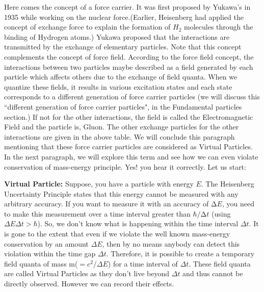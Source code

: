     \par Here comes the concept of a force carrier. It was first proposed by Yukawa's in 1935 while working on the nuclear force.(Earlier, Heisenberg had applied the concept of exchange force to explain the formation of $H_2$ molecules through the binding of Hydrogen atoms.) Yukawa proposed that the interactions are transmitted by the exchange of elementary particles. Note that this concept complements the concept of force field. According to the force field concept, the interactions between two particles maybe described as a field generated by each particle which affects others due to the exchange of field quanta. When we quantize these  fields, it results in various excitation states and each state corresponds to a different generation of force carrier particles (we will discuss this ``different generation of force carrier particles", in the Fundamental particles section.) If not for the other interactions, the field is called the Electromagnetic Field and the particle is, Gluon. The other exchange particles for the other interactions are given in the above table. We will conclude this paragraph mentioning that these force carrier particles are considered as Virtual Particles. In the next paragraph, we will explore this term and see how we can even violate conservation of mass-energy principle. Yes! you hear it correctly. Let us start:
    
        \par {\textbf{Virtual Particle: } Suppose, you have a particle with energy $E$. The Heisenberg Uncertainty Principle states that this energy cannot be measured with any arbitrary accuracy. If you want to measure it with an accuracy of $∆E$, you need to make this measurement over a time interval greater than $\hbar/∆t $ (using $\Delta E \Delta t > \hbar $). So, we don't know what is happening within the time interval $\Delta t$. It is gone to the extent that even if we violate the well known mass-energy conservation by an amount $\Delta E $, then by no means anybody can detect this violation within the time gap $\Delta t $. Therefore, it is possible to create a temporary field quanta of mass m($=c^2/\Delta E$) for a time interval of $\Delta t $. These field quanta are called Virtual Particles as they don't live beyond $\Delta t $ and thus cannot be directly observed. However we can record their effects. }
         \par [
         \textbf{\underline{Note:}} \textit{Virtual particles are real particles. According to Quantum Mechanics, every particle spends some time as a combination of other particles in all possible ways. It is well established and tested. Though the virtual particles are temporary, they interact with real particles and leave their `fingerprint' which can be experimentally verified unambiguously. The first proof was the observation of the Lamb Shift in Hydrogen atom by Willis Lamb and fir which he won the Nobel Prize.}]
         
